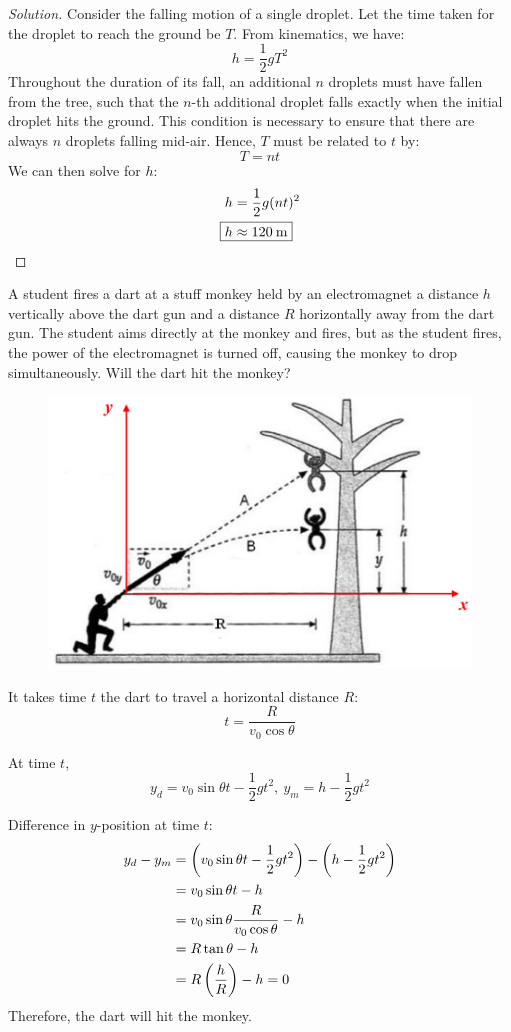 \begin{proof}[Solution]
Consider the falling motion of a single droplet. Let the time taken for the droplet to reach the ground be $T$. From kinematics, we have:
\[ h = \frac{1}{2} gT^2 \]
Throughout the duration of its fall, an additional $n$ droplets must have fallen from the tree, such that the $n$-th additional droplet falls exactly when the initial droplet hits the ground. This condition is necessary to ensure that there are always $n$ droplets falling mid-air. Hence, $T$ must be related to $t$ by:
\[ T = nt \]
We can then solve for $h$:
\begin{align*}
h &= \frac{1}{2}g(nt)^2 \\
\Aboxed{h &\approx 120\:\unit{m}}
\end{align*}
\end{proof}
\pagebreak

\begin{prbm}
A student fires a dart at a stuff monkey held by an electromagnet a distance $h$ vertically above the dart gun and a distance $R$ horizontally away from the dart gun. The student aims directly at the monkey and fires, but as the student fires, the power of the electromagnet is turned off, causing the monkey to drop simultaneously. Will the dart hit the monkey?
\end{prbm}

\begin{figure}[H]
    \centering
    \includegraphics[width=12cm]{images/Monkey_hunter.png}
\end{figure}

\begin{solution}
It takes time $t$ the dart to travel a horizontal distance $R$:
\[ t=\frac{R}{v_0\cos\theta} \]

At time $t$,
\[ y_d=v_0\sin\theta t-\frac{1}{2}gt^2,\:y_m=h-\frac{1}{2}gt^2 \]

Difference in $y$-position at time $t$:
\begin{align*}
y_d-y_m 
&= \left(v_0\sin\theta t - \frac{1}{2}gt^2\right) - \left(h-\frac{1}{2}gt^2\right) \\
&= v_0\sin\theta t - h \\
&= v_0\sin\theta\frac{R}{v_0\cos\theta}-h \\
&= R\tan\theta - h \\
&= R\left(\frac{h}{R}\right)-h = 0
\end{align*}
Therefore, the dart will hit the monkey.
\end{solution}
\pagebreak


